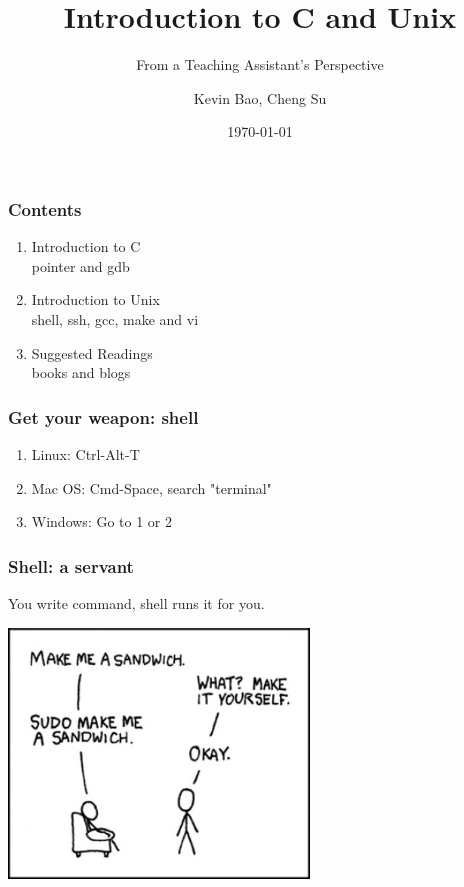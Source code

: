 \documentclass{beamer}
\title{Introduction to C and Unix}
\subtitle{From a Teaching Assistant's Perspective}
\author{Kevin Bao, Cheng Su}
\date{\today}
\begin{document}
	\setcounter{framenumber}{0}
	\frame{\titlepage}
	\setcounter{showProgressBar}{1}
	\setcounter{showSlideNumbers}{1}

	\begin{frame}
		\frametitle{Contents}
		\begin{enumerate}
			\item Introduction to C \\ 
				\textcolor{ExecusharesGrey}{\footnotesize\hspace{1em} pointer and gdb}
			\item Introduction to Unix  \\ 
				\textcolor{ExecusharesGrey}{\footnotesize\hspace{1em} shell, ssh, gcc, make and vi}
			\item Suggested Readings \\ 
				\textcolor{ExecusharesGrey}{\footnotesize\hspace{1em} books and blogs}
		\end{enumerate}
	\end{frame}

	\begin{frame}
		\frametitle{Get your weapon: shell}
		\begin{enumerate}
			\item Linux: Ctrl-Alt-T
			\item Mac OS: Cmd-Space, search "terminal"
			\item Windows: Go to 1 or 2
		\end{enumerate}
	\end{frame}

	\begin{frame}
		\frametitle{Shell: a servant}
		You write command, shell runs it for you.
		\begin{center}
		\includegraphics[width=0.6\textwidth, height=0.6\textheight]{img/sudo.jpg}
		\end{center}
	\end{frame}
\end{document}
